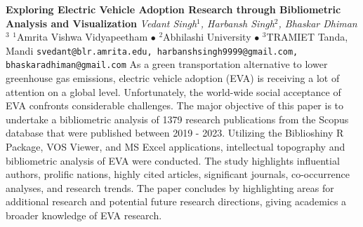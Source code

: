 
    \begin{conf-abstract}[]
        {\textbf{Exploring Electric Vehicle Adoption Research through Bibliometric Analysis and Visualization}}
        {\textit{Vedant Singh$^{1}$, Harbansh Singh$^{2}$, Bhaskar Dhiman$^{3}$}}
        {$^{1}$Amrita Vishwa Vidyapeetham $\bullet$ $^{2}$Abhilashi University $\bullet$ $^{3}$TRAMIET Tanda, Mandi}
        {\texttt{svedant@blr.amrita.edu, harbanshsingh9999@gmail.com, bhaskaradhiman@gmail.com}}
        {As a green transportation alternative to lower greenhouse gas emissions, electric vehicle adoption (EVA) is receiving a lot of attention on a global level. Unfortunately, the world-wide social acceptance of EVA confronts considerable challenges. The major objective of this paper is to undertake a bibliometric analysis of 1379 research publications from the Scopus database that were published between 2019 - 2023. Utilizing the Biblioshiny R Package, VOS Viewer, and MS Excel applications, intellectual topography and bibliometric analysis of EVA were conducted. The study highlights influential authors, prolific nations, highly cited articles, significant journals, co-occurrence analyses, and research trends. The paper concludes by highlighting areas for additional research and potential future research directions, giving academics a broader knowledge of EVA research.}
    \end{conf-abstract}
        
